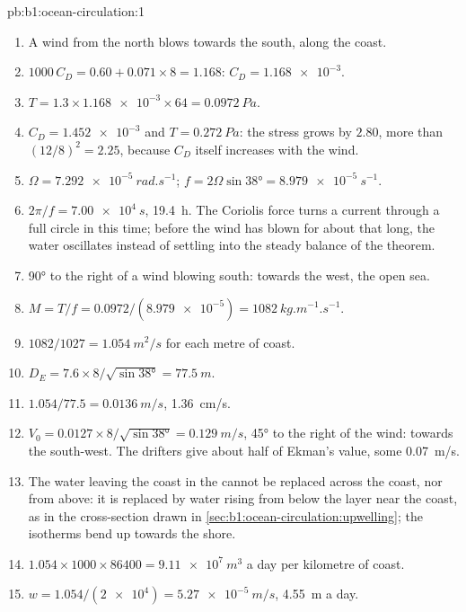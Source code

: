 \begin{solution}{pb:b1:ocean-circulation:1}
\begin{enumerate}
  \item A wind from the north blows towards the south, along the coast.
  \item $1000\,C_D = 0.60 + 0.071 \times 8 = 1.168$: $C_D = \num{1.168e-3}$.
  \item $T = 1.3 \times \num{1.168e-3} \times 64 = \qty{0.0972}{Pa}$.
  \item $C_D = \num{1.452e-3}$ and $T = \qty{0.272}{Pa}$: the stress grows by $2.80$,
        more than $(12/8)^2 = 2.25$, because $C_D$ itself increases with the wind.
  \item $\Omega = \qty{7.292e-5}{rad.s^{-1}}$; $f = 2\Omega\sin\ang{38} =
        \qty{8.979e-5}{s^{-1}}$.
  \item $2\pi/f = \qty{7.00e4}{s}$, \qty{19.4}{h}. The Coriolis force turns a
        current through a full circle in this time; before the wind has blown for
        about that long, the water oscillates instead of settling into the steady
        balance of the theorem.
  \item \ang{90} to the right of a wind blowing south: towards the west, the open
        sea.
  \item $M = T/f = 0.0972/(\num{8.979e-5}) = \qty{1082}{kg.m^{-1}.s^{-1}}$.
  \item $1082/1027 = \qty{1.054}{m^2/s}$ for each metre of coast.
  \item $D_E = 7.6 \times 8/\sqrt{\sin\ang{38}} = \qty{77.5}{m}$.
  \item $1.054/77.5 = \qty{0.0136}{m/s}$, \qty{1.36}{cm/s}.
  \item $V_0 = 0.0127 \times 8/\sqrt{\sin\ang{38}} = \qty{0.129}{m/s}$, \ang{45} to
        the right of the wind: towards the south-west. The drifters give about half
        of Ekman's value, some \qty{0.07}{m/s}.
  \item The water leaving the coast in the  cannot be replaced across the
        coast, nor from above: it is replaced by water rising from below the layer
        near the coast, as in the cross-section drawn in
        \cref{sec:b1:ocean-circulation:upwelling}; the isotherms bend up towards the
        shore.
  \item $1.054 \times 1000 \times 86400 = \qty{9.11e7}{m^3}$ a day per kilometre of
        coast.
  \item $w = 1.054/(\num{2e4}) = \qty{5.27e-5}{m/s}$, \qty{4.55}{m} a day.

\end{enumerate}
\end{solution}
